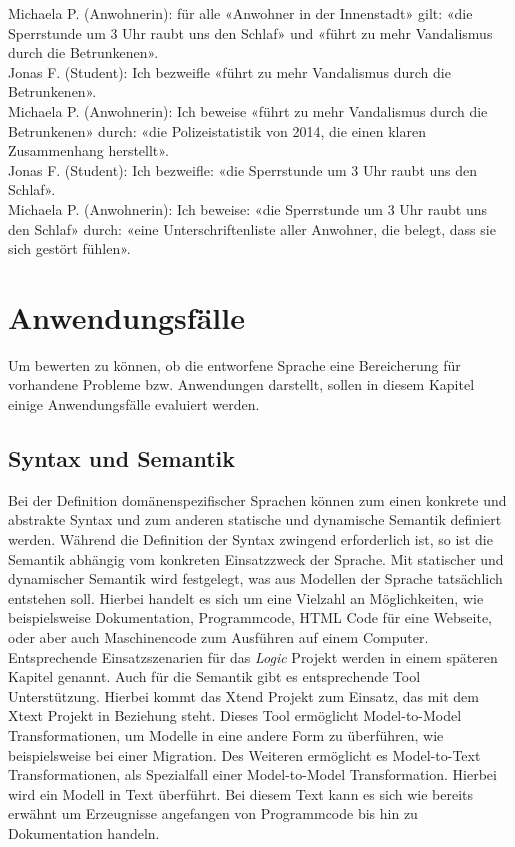 \documentclass[11pt,a4paper,bibtotocnumbered]{scrreprt}
\begin{document}
Michaela P. (Anwohnerin): für alle «Anwohner in der Innenstadt» gilt: «die Sperrstunde um 3 Uhr raubt uns den Schlaf» und «führt zu mehr Vandalismus durch die Betrunkenen».\\
Jonas F. (Student): Ich bezweifle «führt zu mehr Vandalismus durch die Betrunkenen».\\
Michaela P. (Anwohnerin): Ich beweise «führt zu mehr Vandalismus durch die Betrunkenen» durch: «die Polizeistatistik von 2014, die einen klaren Zusammenhang herstellt». \\
Jonas F. (Student): Ich bezweifle: «die Sperrstunde um 3 Uhr raubt uns den Schlaf».\\
Michaela P. (Anwohnerin): Ich beweise: «die Sperrstunde um 3 Uhr raubt uns den Schlaf» durch: «eine Unterschriftenliste aller Anwohner, die belegt, dass sie sich gestört fühlen».

\chapter{Anwendungsfälle} %

Um bewerten zu können, ob die entworfene Sprache eine Bereicherung für vorhandene Probleme bzw. Anwendungen darstellt, sollen in diesem Kapitel einige Anwendungsfälle evaluiert werden.

\section{Syntax und Semantik} %
Bei der Definition domänenspezifischer Sprachen können zum einen konkrete und abstrakte Syntax und zum anderen statische und dynamische Semantik definiert werden.
Während die Definition der Syntax zwingend erforderlich ist, so ist die Semantik abhängig vom konkreten Einsatzzweck der Sprache. Mit statischer und dynamischer Semantik wird festgelegt, was aus Modellen der Sprache tatsächlich entstehen soll. Hierbei handelt es sich um eine Vielzahl an Möglichkeiten, wie beispielsweise Dokumentation, Programmcode, HTML Code für eine Webseite, oder aber auch Maschinencode zum Ausführen auf einem Computer. Entsprechende Einsatzszenarien für das \textit{Logic} Projekt werden in einem späteren Kapitel genannt.
Auch für die Semantik gibt es entsprechende Tool Unterstützung. Hierbei kommt das Xtend Projekt zum Einsatz, das mit dem Xtext Projekt in Beziehung steht. Dieses Tool ermöglicht Model-to-Model Transformationen, um Modelle in eine andere Form zu überführen, wie beispielsweise bei einer Migration. Des Weiteren ermöglicht es Model-to-Text Transformationen, als Spezialfall einer Model-to-Model Transformation. Hierbei wird ein Modell in Text überführt. Bei diesem Text kann es sich wie bereits erwähnt um Erzeugnisse angefangen von Programmcode bis hin zu Dokumentation handeln.
\end{document}
